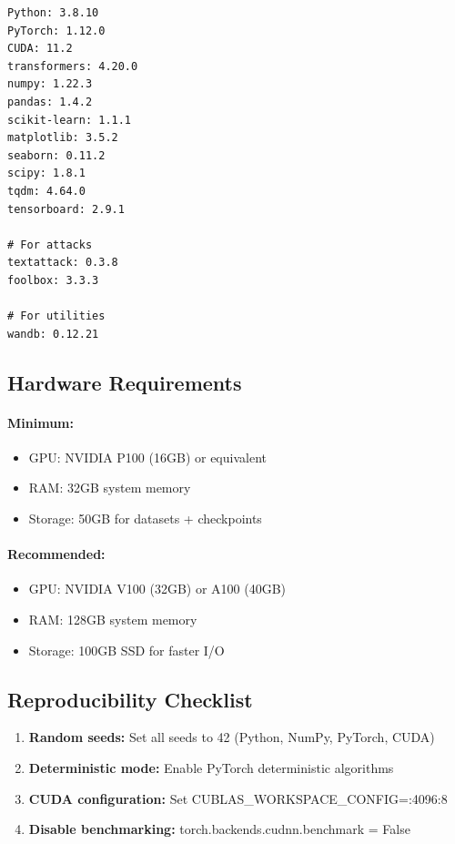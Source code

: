 \documentclass[12pt,a4paper]{article}
\theoremstyle{definition}
\begin{document}
\begin{verbatim}
Python: 3.8.10
PyTorch: 1.12.0
CUDA: 11.2
transformers: 4.20.0
numpy: 1.22.3
pandas: 1.4.2
scikit-learn: 1.1.1
matplotlib: 3.5.2
seaborn: 0.11.2
scipy: 1.8.1
tqdm: 4.64.0
tensorboard: 2.9.1

# For attacks
textattack: 0.3.8
foolbox: 3.3.3

# For utilities
wandb: 0.12.21
\end{verbatim}

\subsection{Hardware Requirements}

\paragraph{Minimum:}
\begin{itemize}
\item GPU: NVIDIA P100 (16GB) or equivalent
\item RAM: 32GB system memory
\item Storage: 50GB for datasets + checkpoints
\end{itemize}

\paragraph{Recommended:}
\begin{itemize}
\item GPU: NVIDIA V100 (32GB) or A100 (40GB)
\item RAM: 128GB system memory
\item Storage: 100GB SSD for faster I/O
\end{itemize}

\subsection{Reproducibility Checklist}

\begin{enumerate}
\item \textbf{Random seeds:} Set all seeds to 42 (Python, NumPy, PyTorch, CUDA)
\item \textbf{Deterministic mode:} Enable PyTorch deterministic algorithms
\item \textbf{CUDA configuration:} Set CUBLAS\_WORKSPACE\_CONFIG=:4096:8
\item \textbf{Disable benchmarking:} torch.backends.cudnn.benchmark = False 

\end{enumerate}
\end{document}
